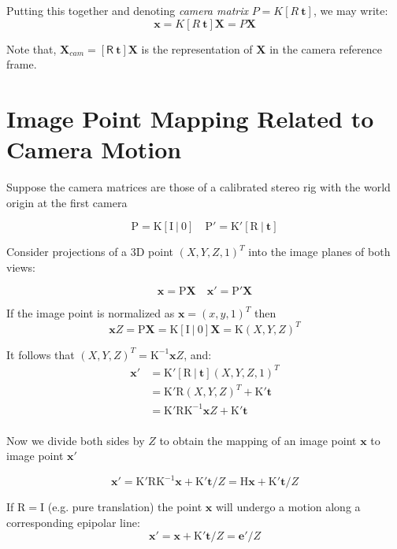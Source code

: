 \documentclass[runningheads]{llncs}
\begin{document}
Putting this together and denoting \emph{camera matrix}
$P=K[R\ \mathbf{t}]$, we may write:
\begin{equation}
\mathbf{x} = K[R\ \mathbf{t}]\mathbf{X} = P\mathbf{X}
\end{equation}

Note that, $ \mathbf{X}_{cam}= [\mathsf{R}\ \mathbf{t}]\mathbf{X}$ is the
representation of $\mathbf{X}$ in the camera reference frame.

\section{Image Point Mapping Related to Camera Motion}

Suppose the camera matrices are those of a calibrated stereo rig with
the world origin at the first camera

\[
\mathrm{P = K[I\ |\ 0]\quad P'=K'[R\ |\ \mathbf{t}]}
\]

Consider projections of a 3D point $(X,Y,Z,1)^T$ into the image planes of both views:

\[
\mathrm{\mathbf{x} = P\mathbf{X} \quad \mathbf{x}' = P'\mathbf{X}}
\]

If the image point is normalized as $\mathbf{x} = (x,y,1)^T$ then
\[
\mathbf{x}Z = \mathrm{P\mathbf{X} = K[I\ |\ 0]\mathbf{X} = K}(X,Y,Z)^T
\]

It follows that $(X,Y,Z)^T = \mathrm{K^{-1}}\mathbf{x}Z$, and:
\begin{align}
  \mathbf{x}' &= \mathrm{K'[R\ |\ \mathbf{t}]}(X,Y,Z,1)^T \\
  &= \mathrm{K'R}(X,Y,Z)^T + \mathrm{K'\mathbf{t}}\\
  &= \mathrm{K'RK^{-1}}\mathbf{x}Z + \mathrm{K'\mathbf{t}}\\
\end{align}

Now we divide both sides by $Z$ to obtain the mapping of an image point $\mathbf{x}$ to image point $\mathbf{x}'$

\begin{equation}
  \label{eq:point_motion}
  \mathbf{x}' = \mathrm{K'RK^{-1}}\mathbf{x} + \mathrm{K'}\mathbf{t}/Z = \mathrm{H}\mathbf{x}+ \mathrm{K'}\mathbf{t}/Z
\end{equation}

If $\mathrm{R = I}$ (e.g. pure translation) the point $\mathbf{x}$ will undergo a motion along a corresponding epipolar line:
\[
\mathbf{x}' = \mathbf{x}+ \mathrm{K'}\mathbf{t}/Z = \mathbf{e}'/Z
\]
\end{document}
